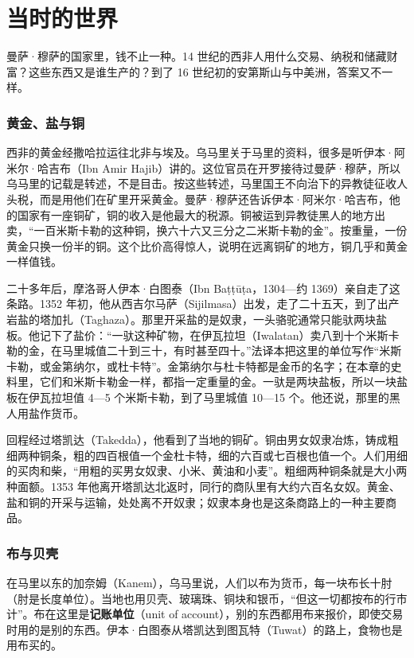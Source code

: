 \section{当时的世界}\label{sec:africa-world}

曼萨·穆萨的国家里，钱不止一种。14 世纪的西非人用什么交易、纳税和储藏财富？这些东西又是谁生产的？到了 16 世纪初的安第斯山与中美洲，答案又不一样。

\subsubsection{黄金、盐与铜}
西非的黄金经撒哈拉运往北非与埃及。乌马里关于马里的资料，很多是听伊本·阿米尔·哈吉布（Ibn Amir Hajib）讲的。这位官员在开罗接待过曼萨·穆萨，所以乌马里的记载是转述，不是目击。按这些转述，马里国王不向治下的异教徒征收人头税，而是用他们在矿里开采黄金\cite{umari1927}。曼萨·穆萨还告诉伊本·阿米尔·哈吉布，他的国家有一座铜矿，铜的收入是他最大的税源。铜被运到异教徒黑人的地方出卖，“一百米斯卡勒的这种铜，换六十六又三分之二米斯卡勒的金”\cite{umari1927}。按重量，一份黄金只换一份半的铜。这个比价高得惊人，说明在远离铜矿的地方，铜几乎和黄金一样值钱。

二十多年后，摩洛哥人伊本·白图泰（Ibn Baṭṭūṭa，1304—约 1369）亲自走了这条路。1352 年初，他从西吉尔马萨（Sijilmasa）出发，走了二十五天，到了出产岩盐的塔加扎（Taghaza）\cite{battuta1858}。那里开采盐的是奴隶，一头骆驼通常只能驮两块盐板。他记下了盐价：“一驮这种矿物，在伊瓦拉坦（Iwalatan）卖八到十个米斯卡勒的金，在马里城值二十到三十，有时甚至四十。”\cite{battuta1858}法译本把这里的单位写作“米斯卡勒，或金第纳尔，或杜卡特”。金第纳尔与杜卡特都是金币的名字；在本章的史料里，它们和米斯卡勒金一样，都指一定重量的金。一驮是两块盐板，所以一块盐板在伊瓦拉坦值 4—5 个米斯卡勒，到了马里城值 10—15 个。他还说，那里的黑人用盐作货币\cite{battuta1858}。

回程经过塔凯达（Takedda），他看到了当地的铜矿。铜由男女奴隶冶炼，铸成粗细两种铜条，粗的四百根值一个金杜卡特，细的六百或七百根也值一个。人们用细的买肉和柴，“用粗的买男女奴隶、小米、黄油和小麦”\cite{battuta1858}。粗细两种铜条就是大小两种面额。1353 年他离开塔凯达北返时，同行的商队里有大约六百名女奴\cite{battuta1858}。黄金、盐和铜的开采与运输，处处离不开奴隶；奴隶本身也是这条商路上的一种主要商品。

\subsubsection{布与贝壳}
在马里以东的加奈姆（Kanem），乌马里说，人们以布为货币，每一块布长十肘（肘是长度单位）。当地也用贝壳、玻璃珠、铜块和银币，“但这一切都按布的行市计”\cite{umari1927}。布在这里是\textbf{记账单位}（unit of account），别的东西都用布来报价，即使交易时用的是别的东西。伊本·白图泰从塔凯达到图瓦特（Tuwat）的路上，食物也是用布买的\cite{battuta1858}。

